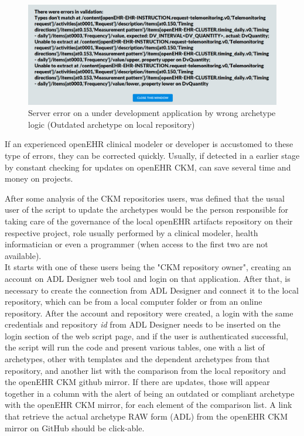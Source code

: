 \documentclass[mim_thesis.tex]{subfiles}
\begin{document}
\begin{figure}[H]
	\centering
    \includegraphics[width=1\textwidth]{img/server_error.PNG}
	\caption{Server error on a under development application by wrong archetype logic (Outdated archetype on local repository)}
	\label{fig:server_arch_error}
\end{figure}

If an experienced openEHR clinical modeler or developer is accustomed to these type of errors, they can be corrected quickly. Usually, if detected in a earlier stage by constant checking for updates on openEHR CKM, can save several time and money on projects.

After some analysis of the CKM repositories users, was defined that the usual user of the script to update the archetypes would be the person responsible for taking care of the governance of the local openEHR artifacts repository on their respective project, role usually performed by a clinical modeler, health informatician or even a programmer (when access to the first two are not available).\\ 

It starts with one of these users being the "CKM repository owner", creating an account on ADL Designer web tool and login on that application. After that, is necessary to create the connection from ADL Designer and connect it to the local repository, which can be from a local computer folder or from an online repository. After the account and repository were created, a login with the same credentials and repository \textit{id} from ADL Designer needs to be inserted on the login section of the web script page, and if the user is authenticated successful, the script will run the code and present various tables, one with a list of archetypes, other with templates and the dependent archetypes from that repository, and another list with the comparison from the local repository and the openEHR CKM github mirror. If there are updates, those will appear together in a column with the alert of being an outdated or compliant archetype with the openEHR CKM mirror, for each element of the comparison list. A link that retrieve the actual archetype RAW form (ADL) from the openEHR CKM mirror on GitHub should be click-able.\\ 
\end{document}
